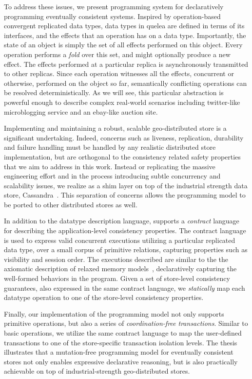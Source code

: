 To address these issues, we present \quelea programming system for
declaratively programming eventually consistent systems. Inspired by
operation-based convergent replicated data types, data types in quelea are
defined in terms of its interfaces, and the effects that an operation has on a
data type. Importantly, the state of an object is simply the set of all effects
performed on this object. Every operation performs a \emph{fold} over this set,
and might optionally produce a new effect. The effects performed at a
particular replica is asynchronously transmitted to other replicas. Since each
operation witnesses all the effects, concurrent or otherwise, performed on the
object so far, semantically conflicting operations can be resolved
deterministically. As we will see, this particular abstraction is powerful
enough to describe complex real-world scenarios including twitter-like
microblogging service and an ebay-like auction site.

Implementing and maintaining a robust, scalable geo-distributed store is a
significant undertaking. Indeed, concerns such as liveness, replication,
durability and failure handling must be handled by any realistic distributed
store implementation, but are orthogonal to the consistency related safety
properties that we aim to address in this work. Instead or replicating the
massive engineering effort and in the process introducing subtle concurrency
and scalability issues, we realize \quelea as a shim layer on top of the
industrial strength data store, Cassandra~\cite{Lakshman2010}. This separation
of concerns allows the \quelea programming model to be ported to other
distributed stores as well.

In addition to the datatype description language, \quelea supports a
\emph{contract} language for describing the application-level consistency
properties. The contract language is used to express valid concurrent
executions utilizing a particular replicated data type, over a small corpus of
primitive relations, capturing properties such as visibility and session order.
The executions described are similar to the the axiomatic description of
relaxed memory models~\cite{Demange2013,Burckhardt2014}, declaratively
capturing the well-formed behaviors in the program. Given a set of store-level
consistency guarantees, also expressed in the same contract language, we
\emph{statically} map each datatype operation to one of the store-level
consistency properties.

Finally, our implementation of the \quelea programming model not only supports
primitive operations, but also a series of \emph{coordination-free
transactions}. Similar to basic operations, we utilize the same contract
language to map the user-defined transactions to one of the store-specific
transaction isolation levels. The thesis illustrates that a mutation-free
programming model for eventually consistent stores not only enables expressive
declarative reasoning, but is also practically achievable on top of
industrial-strength geo-distributed stores.

